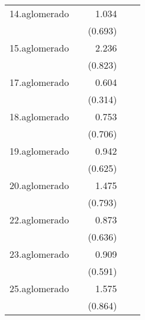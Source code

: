 {\begin{longtable}{l*{4}{D{.}{.}{-1}}}
\addlinespace
14.aglomerado&                     &       1.034         &                     &                     \\
            &                     &     (0.693)         &                     &                     \\
\addlinespace
15.aglomerado&                     &       2.236\sym{**} &                     &                     \\
            &                     &     (0.823)         &                     &                     \\
\addlinespace
17.aglomerado&                     &       0.604         &                     &                     \\
            &                     &     (0.314)         &                     &                     \\
\addlinespace
18.aglomerado&                     &       0.753         &                     &                     \\
            &                     &     (0.706)         &                     &                     \\
\addlinespace
19.aglomerado&                     &       0.942         &                     &                     \\
            &                     &     (0.625)         &                     &                     \\
\addlinespace
20.aglomerado&                     &       1.475         &                     &                     \\
            &                     &     (0.793)         &                     &                     \\
\addlinespace
22.aglomerado&                     &       0.873         &                     &                     \\
            &                     &     (0.636)         &                     &                     \\
\addlinespace
23.aglomerado&                     &       0.909         &                     &                     \\
            &                     &     (0.591)         &                     &                     \\
\addlinespace
25.aglomerado&                     &       1.575         &                     &                     \\
            &                     &     (0.864)         &                     &                     \\

\end{longtable}}
